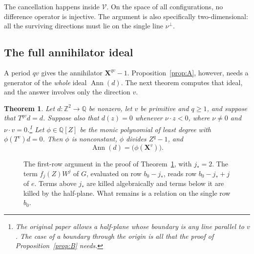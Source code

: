 \documentclass[11pt,a4paper,reqno]{amsart}
\newtheorem{theorem}{Theorem}[section]
\theoremstyle{definition}
\theoremstyle{remark}
\newcommand{\Z}{\mathbb Z}
\newcommand{\Q}{\mathbb Q}
\newcommand{\mon}[1]{\boldsymbol X^{#1}}
\DeclareMathOperator{\Ann}{Ann}
\numberwithin{equation}{section}
\begin{document}
The cancellation happens inside $\mathcal V$. On the space of all configurations, no difference operator is injective. The argument is also specifically two-dimensional: all the surviving directions must lie on the single line $\nu^\perp$.

\subsection{The full annihilator ideal}\label{ssec:exact}
A period $qv$ gives the annihilator $\mon{qv}-1$. Proposition~\ref{prop:A}, however, needs a generator of the \emph{whole} ideal $\Ann(d)$. The next theorem computes that ideal, and the answer involves only the direction $v$.

\begin{theorem}\label{thm:exact-ideal}
Let $d\colon\Z^2\to\Q$ be nonzero, let $v$ be primitive and $q\ge1$, and suppose that $T^{qv}d=d$. Suppose also that $d(z)=0$ whenever $\nu\cdot z<0$, where $\nu\ne0$ and $\nu\cdot v=0$.\footnote{The original paper allows a half-plane whose boundary is any line parallel to $v$. The case of a boundary through the origin is all that the proof of Proposition~\ref{prop:B} needs.} Let $\phi\in\Q[Z]$ be the monic polynomial of least degree with $\phi(T^v)d=0$. Then $\phi$ is nonconstant, $\phi$ divides $Z^q-1$, and
\[
 \Ann(d)=\bigl(\phi(\mon v)\bigr).
\]
\end{theorem}

\begin{figure}[ht]
\centering
{}
\caption{The first-row argument in the proof of Theorem~\ref{thm:exact-ideal}, with $j_*=2$. The term $f_j(Z)W^j$ of $G$, evaluated on row $b_0-j_*$, reads row $b_0-j_*+j$ of $e$. Terms above $j_*$ are killed algebraically and terms below it are killed by the half-plane. What remains is a relation on the single row $b_0$.}
\label{fig:firstrow}
\end{figure}
\end{document}
